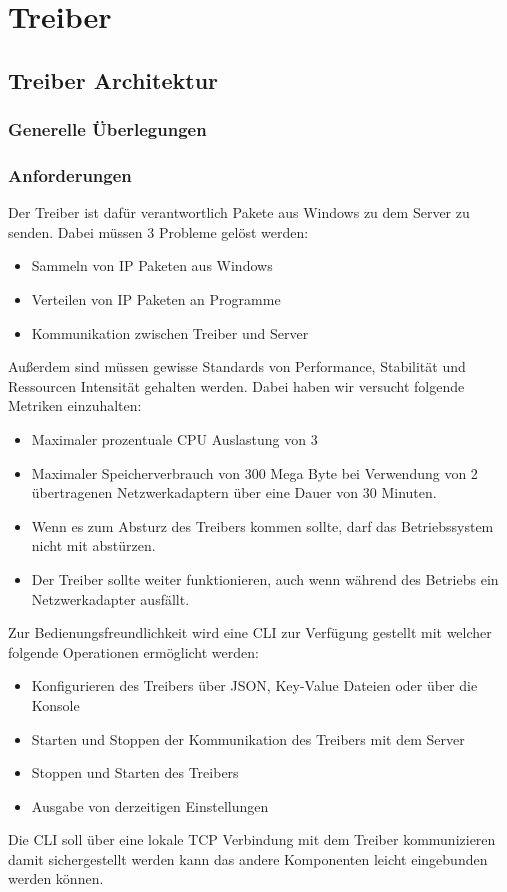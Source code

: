 \chapter{Treiber}
\label{chap:Treiber}

\section{Treiber Architektur}
\subsection{Generelle Überlegungen}
\subsection{Anforderungen}
Der Treiber ist dafür verantwortlich Pakete aus Windows zu dem Server zu senden. Dabei müssen 3 Probleme gelöst werden:
\begin{itemize}
    \item Sammeln von IP Paketen aus Windows
    \item Verteilen von IP Paketen an Programme
    \item Kommunikation zwischen Treiber und Server
\end{itemize}
Außerdem sind müssen gewisse Standards von Performance, Stabilität und Ressourcen Intensität gehalten werden. Dabei haben wir versucht folgende Metriken einzuhalten:
\begin{itemize}
    \item Maximaler prozentuale CPU Auslastung von 3 %
    \item Maximaler Speicherverbrauch von 300 Mega Byte bei Verwendung von 2 übertragenen Netzwerkadaptern über eine Dauer von 30 Minuten.
    \item Wenn es zum Absturz des Treibers kommen sollte, darf das Betriebssystem nicht mit abstürzen.
    \item Der Treiber sollte weiter funktionieren, auch wenn während des Betriebs ein Netzwerkadapter ausfällt.
\end{itemize}
Zur Bedienungsfreundlichkeit wird eine CLI zur Verfügung gestellt mit welcher folgende Operationen ermöglicht werden:
\begin{itemize}
    \item Konfigurieren des Treibers über JSON, Key-Value Dateien oder über die Konsole
    \item Starten und Stoppen der Kommunikation des Treibers mit dem Server
    \item Stoppen und Starten des Treibers
    \item Ausgabe von derzeitigen Einstellungen
\end{itemize}
Die CLI soll über eine lokale TCP Verbindung mit dem Treiber kommunizieren damit sichergestellt werden kann das andere Komponenten leicht eingebunden werden können.
\newpage
